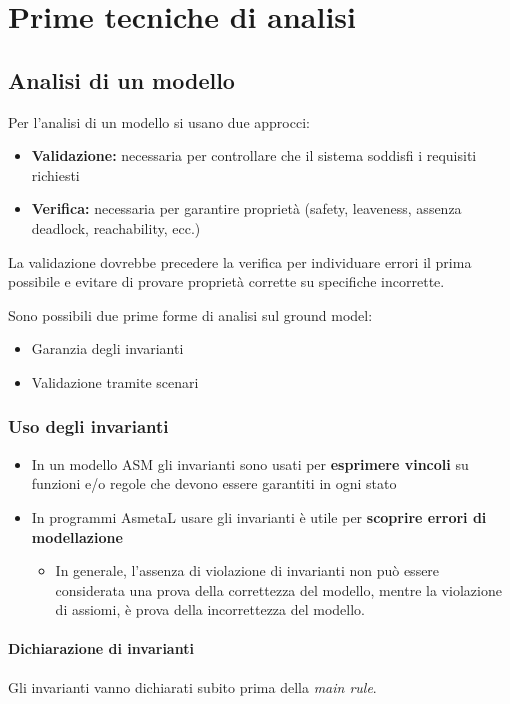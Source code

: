 \chapter{Prime tecniche di analisi}

\section{Analisi di un modello}
Per l'analisi di un modello si usano due approcci:
\begin{itemize}
    \item \textbf{Validazione:} necessaria per controllare che il
    sistema soddisfi i requisiti richiesti
    \item \textbf{Verifica:} necessaria per garantire proprietà
    (safety, leaveness, assenza deadlock,
    reachability, ecc.)
\end{itemize}
La validazione dovrebbe precedere la verifica per individuare errori il prima possibile
e evitare di provare proprietà corrette su specifiche incorrette.

\noindent Sono possibili due prime forme di analisi
sul ground model:
\begin{itemize}
    \item Garanzia degli invarianti
    \item Validazione tramite scenari
\end{itemize}

\subsection{Uso degli invarianti}
\begin{itemize}
    \item In un modello ASM gli invarianti sono usati per \textbf{esprimere vincoli} su funzioni e/o regole che devono essere garantiti in ogni stato
    \item In programmi AsmetaL usare gli invarianti è utile per \textbf{scoprire errori di modellazione}
    \begin{itemize}
        \item In generale, l'assenza di violazione di invarianti non può essere considerata una prova della correttezza del modello, mentre la violazione di
        assiomi, è prova della incorrettezza del modello.
    \end{itemize}
\end{itemize}

\subsubsection{Dichiarazione di invarianti}
\noindent Gli invarianti vanno dichiarati subito prima della \textit{main rule}.

